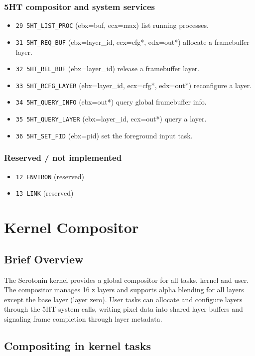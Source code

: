 \documentclass[11pt,a4paper]{article}
\begin{document}
\subsubsection{5HT compositor and system services}
\begin{itemize}
	\item \texttt{29 5HT\_LIST\_PROC} (ebx=buf, ecx=max) list running processes.
	\item \texttt{31 5HT\_REQ\_BUF} (ebx=layer\_id, ecx=cfg*, edx=out*) allocate a framebuffer layer.
	\item \texttt{32 5HT\_REL\_BUF} (ebx=layer\_id) release a framebuffer layer.
	\item \texttt{33 5HT\_RCFG\_LAYER} (ebx=layer\_id, ecx=cfg*, edx=out*) reconfigure a layer.
	\item \texttt{34 5HT\_QUERY\_INFO} (ebx=out*) query global framebuffer info.
	\item \texttt{35 5HT\_QUERY\_LAYER} (ebx=layer\_id, ecx=out*) query a layer.
	\item \texttt{36 5HT\_SET\_FID} (ebx=pid) set the foreground input task.
\end{itemize}

\subsubsection{Reserved / not implemented}
\begin{itemize}
	\item \texttt{12 ENVIRON} (reserved)
	\item \texttt{13 LINK} (reserved)
\end{itemize}

    \section{Kernel Compositor}
    \subsection{Brief Overview}
    The Serotonin kernel provides a global compositor for all tasks, kernel and user. The compositor manages 16 z layers and supports alpha blending for all layers except the base layer (layer zero). User tasks can allocate and configure layers through the 5HT system calls, writing pixel data into shared layer buffers and signaling frame completion through layer metadata.

    \subsection{Compositing in kernel tasks}
\end{document}
